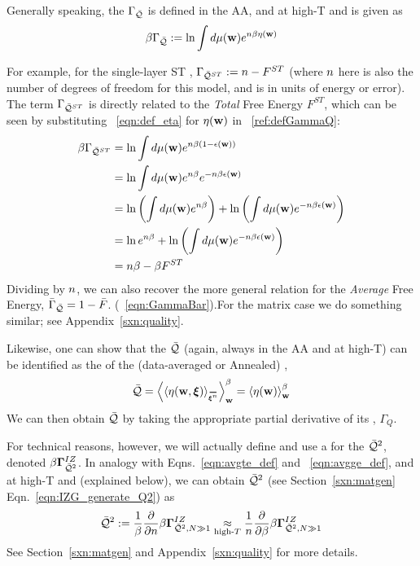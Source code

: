 Generally speaking, the \Quality \GeneratingFunction $\Gamma_{\bar{\mathcal{Q}}}$ is defined in the AA, and at high-T and is given as
\begin{align}
  \label{ref:defGammaQ}
  \beta\Gamma_{\bar{\mathcal{Q}}} := \ln\int d\mu({\mathbf{w}}) e^{n\beta\eta({\mathbf{w}})}
\end{align}

For example, for the single-layer ST \Perceptron, $\Gamma_{\bar{\mathcal{Q}}^{ST}}:=n-F^{ST}$
(where $n$ here is also the number of degrees of freedom for this model, and is in units of energy or error).
The term $\Gamma_{\bar{\mathcal{Q}}^{ST}}$ is directly related to the \emph{Total} Free Energy $F^{ST}$, which can be seen by substituting \EQN~\ref{eqn:def_eta}
for $\eta({\mathbf{w}})$ in \EQN~\ref{ref:defGammaQ}:
\begin{align}
  \label{ref:defGammaQtoF}
  \beta\Gamma_{\bar{\mathcal{Q}}^{ST}}
  &= \ln\int d\mu({\mathbf{w}}) e^{n\beta(1-\epsilon({\mathbf{w}}))} \\ \nonumber
    &= \ln\int d\mu({\mathbf{w}}) e^{n\beta}e^{-n\beta\epsilon({\mathbf{w}})} \\ \nonumber
    &= \ln\left(\int d\mu({\mathbf{w}}) e^{n\beta}\right)+\ln\left(\int d\mu({\mathbf{w}})e^{-n\beta\epsilon({\mathbf{w}})}\right) \\ \nonumber
   &= \ln e^{n\beta}+\ln\left(\int d\mu({\mathbf{w}})e^{-n\beta\epsilon({\mathbf{w}})}\right) \\ \nonumber
  &= n\beta -\beta F^{ST}
\end{align}
Dividing by $n$, we can also recover the more general relation for the \emph{Average} Free Energy,
$\bar{\Gamma}_{\bar{\mathcal{Q}}}=1-\bar{F}$. (\EQN~\ref{eqn:GammaBar}).For the matrix case we do something similar; see Appendix~\ref{sxn:quality}.

Likewise, one can show that the \Quality $\bar{\mathcal{Q}}$
(again, always in the AA and at high-T) can be identified as the \ThermalAverage of the (data-averaged or Annealed)
\SelfOverlap, 
\begin{align}
  \label{eqn:Q_def_eta}
  \Q = \THRMAVGw{\langle\ETA(\WVEC,\XI)\rangle_{\AVGNDXIn}} =\THRMAVGw{\ETA(\WVEC)}
\end{align}
We can then obtain $\bar{\mathcal{Q}}$ by taking the appropriate partial derivative of its \GeneratingFunction, $\Gamma_{Q}$.

For technical reasons, however, we will actually define and use a
\GeneratingFunction for the \AverageLayerQualitySquared $\bar{\mathcal{Q}}^{2}$, denoted $\beta\mathbf{\Gamma}^{IZ}_{\bar{\mathcal{Q}}^{2}}$.
In analogy with Eqns.~\ref{eqn:avgte_def} and ~\ref{eqn:avgge_def}, and at high-T and \LargeN (explained below),
we can obtain $\bar{\mathcal{Q}}^{2}$ (see Section~\ref{sxn:matgen} Eqn.~\ref{eqn:IZG_generate_Q2}) as
\begin{align}
  \label{eqn:QT_def}
  \bar{\mathcal{Q}}^{2} := \frac{1}{\beta}\frac{\partial }{\partial n}\beta\mathbf{\Gamma}^{IZ}_{\bar{\mathcal{Q}}^{2},N\gg 1}
  \underset{\text{high-}T}{\approx}
\frac{1}{n}\frac{\partial }{\partial \beta}\beta\mathbf{\Gamma}^{IZ}_{\bar{\mathcal{Q}}^{2},N\gg 1}
\end{align}
See Section~\ref{sxn:matgen} and Appendix~\ref{sxn:quality} for more details.


